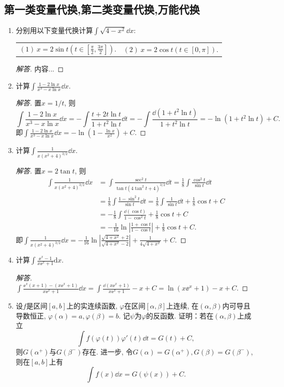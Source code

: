 \subsection{第一类变量代换,第二类变量代换,万能代换}
\begin{2a}
\begin{enumerate}
\item 分别用以下变量代换计算\(\int \sqrt{4-x^2}\dd x\):\\
\begin{center}\begin{tabular}{ll}
\((1)\ x=2\sin t\left(t\in\left[\frac{\pi}{2},\frac{3\pi}{2}\right]\right)\).
&\((2)\ x=2\cos t\left(t\in[0,\pi]\right)\).
\end{tabular}\end{center}
\begin{proof}[解答]
内容...
\end{proof}
\item 计算\(\int\frac{1-2\ln x}{x^3-x\ln x}\dd x\).
\begin{proof}[解答]
置\(x=1/t\), 则\[\int\frac{1-2\ln x}{x^3-x\ln x}\dd x
=-\int\frac{t+2t\ln t}{1+t^2\ln t}\dd t
=-\int\frac{\dd\left(1+t^2\ln t\right)}{1+t^2\ln t}
=-\ln\left(1+t^2\ln t\right)+C.\]
即\(\int\frac{1-2\ln x}{x^3-x\ln x}\dd x
=-\ln\left(1-\frac{\ln x}{x^2}\right)+C\).
\end{proof}
\item 计算\(\int\frac{1}{x(x^2+4)^{3/2}}\dd x\).
\begin{proof}[解答]
置\(x=2\tan t\), 则
\[\begin{aligned}
\int\frac{1}{x(x^2+4)^{3/2}}\dd x
&=\int\frac{\sec^2t}{\tan t\left(4\tan^2t+4\right)^{3/2}}\dd t
=\frac{1}{8}\int\frac{\cos^2t}{\sin t}\dd t\\
&=\frac{1}{8}\int\frac{1-\sin ^2t}{\sin t}\dd t
=\frac{1}{8}\int\frac{1}{\sin t}\dd t+\frac{1}{8}\cos t+C\\
&=-\frac{1}{8}\int\frac{\dd (\cos t)}{1-\cos^2t}+\frac{1}{8}\cos t+C\\
&=-\frac{1}{16}\ln\left|\frac{1+\cos t}{1-\cos t}\right|+\frac{1}{8}\cos t+C.
\end{aligned}\]即\(\int\frac{1}{x(x^2+4)^{3/2}}\dd x
=-\frac{1}{16}\ln\left|\frac{\sqrt{4+x^2}+2}{\sqrt{4+x^2}-2}\right|
+\frac{1}{4\sqrt{4+x^2}}+C.\)
\end{proof}
\item 计算\(\int\frac{\ee^x-1}{x\ee^x+1}\mathrm{d}x\).
\begin{proof}[解答]
\(\int\frac{\ee^x(x+1)-(x\ee^x+1)}{x\ee^x+1}\dd x=\int\frac{\dd(x\ee^x+1)}{x\ee^x+1}-x+C=\ln(x\ee^x+1)-x+C.\)
\end{proof}
\item 设\(f\)是区间\([a,b]\)上的实连续函数, \(\varphi\)在区间\([\alpha,\beta]\)上连续, 
在\((\alpha,\beta)\)内可导且导数恒正, \(\varphi(\alpha)=a,\varphi(\beta)=b.\) 
记\(\psi\)为\(\varphi\)的反函数. 证明：若在\((\alpha,\beta)\)上成立
\[\int f(\varphi(t))\varphi'(t)\dd t=G(t)+C,\]
则\(G(\alpha^+)\)与\(G(\beta^-)\)存在. 
进一步, 令\(G(\alpha)=G(\alpha^+),G(\beta)=G(\beta^-)\), 则在\([a,b]\)上有
\[\int f(x)\dd x=G(\psi(x))+C.\]
\end{enumerate}
\end{2a}
